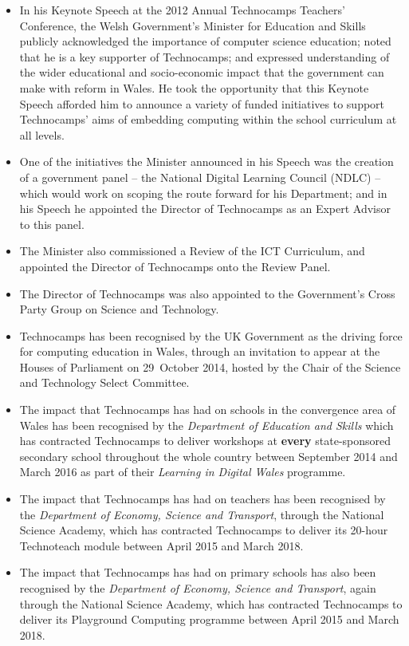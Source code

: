 \documentclass{sig-alternate}
\begin{document}
\begin{itemize}

\item
In his Keynote Speech at the 2012 Annual Technocamps Teachers' Conference,
the Welsh Government's Minister for Education and Skills
publicly acknowledged the importance of computer science education;
noted that he is a key supporter of Technocamps;
and expressed understanding of the wider educational and
socio-economic impact that the government can make with reform in Wales.
He took the opportunity that this Keynote Speech afforded him
to announce a variety of funded initiatives to
support Technocamps' aims of embedding computing within
the school curriculum at all levels.

\item
One of the initiatives the Minister announced in his Speech
was the creation of a government panel
-- the National Digital Learning Council (NDLC) --
which would work on scoping the route forward for
his Department; and in his Speech he appointed
the Director of Technocamps as an Expert Advisor
to this panel.

\item
The Minister also commissioned a Review of the ICT Curriculum,
and appointed the Director of Technocamps onto the Review Panel.

\item
The Director of Technocamps was also appointed
to the Government's
Cross Party Group on Science and Technology.

\item
Technocamps has been recognised by the UK Government
as the driving force for computing education in Wales,
through an invitation to appear at the Houses of Parliament
on 29~October 2014,
hosted by the Chair of the Science and Technology Select Committee.

\item
The impact that Technocamps has had on schools
in the convergence area of Wales has been recognised
by the \emph{Department of Education and Skills} which has contracted
Technocamps to deliver workshops at \textbf{every}
state-sponsored secondary school throughout
the whole country between September 2014
and March 2016 as part of their
\emph{Learning in Digital Wales} programme.

\item
The impact that Technocamps has had on teachers has been
recognised by the \emph{Department of Economy, Science and Transport},
through the National Science Academy,
which has contracted Technocamps to deliver its 20-hour Technoteach module
between April 2015 and March 2018.

\item
The impact that Technocamps has had on primary schools has also been
recognised by the \emph{Department of Economy, Science and Transport},
again through the National Science Academy,
which has contracted Technocamps to deliver its Playground Computing
programme between April 2015 and March 2018.

\end{itemize}
\end{document}
